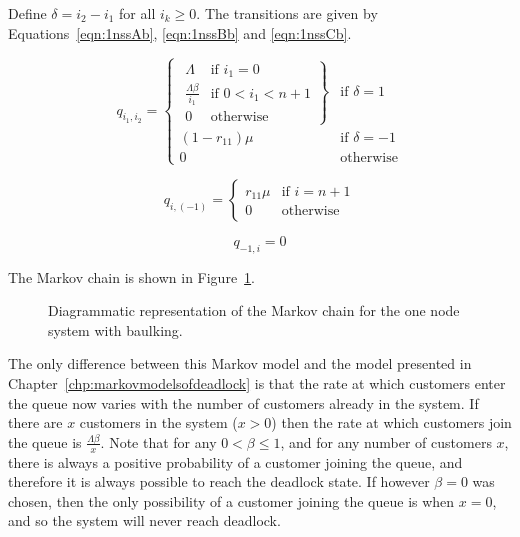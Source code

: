 \documentclass{article}
\begin{document}
Define $\delta = i_2 - i_1$ for all $i_k \geq 0$. The transitions are given by Equations~\ref{eqn:1nssAb}, \ref{eqn:1nssBb} and \ref{eqn:1nssCb}.

\begin{equation}\label{eqn:1nssAb}
  q_{i_1, i_2} = \left\{
  \begin{array}{rr}
    \left. \begin{array}{rr}
      \Lambda & \text{if } i_1 = 0 \\
      \frac{\Lambda \beta}{i_1} & \text{if } 0 < i_1 < n + 1 \\
      0 & \text{otherwise}
    \end{array} \right\} & \text{if } \delta = 1 \\
    (1 - r_{11})\mu & \text{if } \delta = -1 \\
    0 & \text{otherwise}
  \end{array} \right.
\end{equation}

\begin{equation}\label{eqn:1nssBb}
  q_{i, (-1)} = \left\{
  \begin{array}{rr}
    r_{11}\mu & \text{if } i = n + 1 \\
    0 & \text{otherwise}
  \end{array}
  \right.
\end{equation}

\begin{equation}\label{eqn:1nssCb}
  q_{-1, i} = 0
\end{equation}

The Markov chain is shown in Figure~\ref{fig:1nodeMCbaulking}.

\begin{figure}[!htbp]
  \begin{center}
    
  \end{center}
  \caption{Diagrammatic representation of the Markov chain for the one node system with baulking.}
  \label{fig:1nodeMCbaulking}
\end{figure}

The only difference between this Markov model and the model presented in Chapter~\ref{chp:markovmodelsofdeadlock} is that the rate at which customers enter the queue now varies with the number of customers already in the system.
If there are $x$ customers in the system ($x > 0$) then the rate at which customers join the queue is $\frac{\Lambda \beta}{x}$.
Note that for any $0 < \beta \leq 1$, and for any number of customers $x$, there is always a positive probability of a customer joining the queue, and therefore it is always possible to reach the deadlock state.
If however $\beta = 0$ was chosen, then the only possibility of a customer joining the queue is when $x = 0$, and so the system will never reach deadlock.
\end{document}
